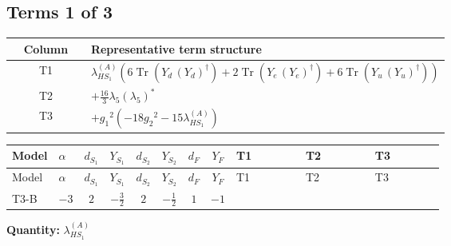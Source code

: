 \documentclass[8pt]{article}
\begin{document}
\begin{landscape}
\subsection*{Terms 1 of 3}
\begin{center}
\begin{tabular}{@{}c >{\raggedright\arraybackslash}p{0.82\linewidth}@{}}
\toprule
Column & Representative term structure \\
\midrule
T1 & \(\displaystyle {\lambda_{HS_1}^{(A)}} (6 \operatorname{Tr}\!\left({Y_d}\,\left({Y_d}\right)^{\dagger}\right)+2 \operatorname{Tr}\!\left({Y_e}\,\left({Y_e}\right)^{\dagger}\right)+6 \operatorname{Tr}\!\left({Y_u}\,\left({Y_u}\right)^{\dagger}\right))\) \\
\midrule
T2 & \(\displaystyle +\frac{16}{3} {\lambda_5} \left({\lambda_5}\right)^{*}\) \\
\midrule
T3 & \(\displaystyle +{g_1}^2 \left(-18 {g_2}^2-15 {\lambda_{HS_1}^{(A)}}\right)\) \\
\midrule
\bottomrule
\end{tabular}
\end{center}
\smallskip
\tiny
\begin{longtable}{@{}llcccccc >{\raggedright\arraybackslash}p{0.21\linewidth} >{\raggedright\arraybackslash}p{0.21\linewidth} >{\raggedright\arraybackslash}p{0.21\linewidth}@{}}
\toprule
Model & $\alpha$ & $d_{S_1}$ & $Y_{S_1}$ & $d_{S_2}$ & $Y_{S_2}$ & $d_F$ & $Y_F$ & T1 & T2 & T3 \\
\midrule
\endfirsthead
\toprule
Model & $\alpha$ & $d_{S_1}$ & $Y_{S_1}$ & $d_{S_2}$ & $Y_{S_2}$ & $d_F$ & $Y_F$ & T1 & T2 & T3 \\
\midrule
\endhead
T3-B & $-3$ & $2$ & $-\frac{3}{2}$ & $2$ & $-\frac{1}{2}$ & $1$ & $-1$ & \scriptsize\adjustbox{max width=\linewidth}{$\begin{gathered} {\lambda_{HS_1}^{(A)}} (6 \operatorname{Tr}\!\left({Y_d}\,\left({Y_d}\right)^{\dagger}\right)+2 \operatorname{Tr}\!\left({Y_e}\,\left({Y_e}\right)^{\dagger}\right)+6 \operatorname{Tr}\!\left({Y_u}\,\left({Y_u}\right)^{\dagger}\right))\end{gathered}$} & \scriptsize\adjustbox{max width=\linewidth}{$\begin{gathered} +\frac{16}{3} {\lambda_5} \left({\lambda_5}\right)^{*}\end{gathered}$} & \scriptsize\adjustbox{max width=\linewidth}{$\begin{gathered} +{g_1}^2 \left(-18 {g_2}^2-15 {\lambda_{HS_1}^{(A)}}\right)\end{gathered}$} \\
\midrule
\bottomrule
\end{longtable}
\clearpage
\noindent\textbf{Quantity: }$\lambda_{HS_1}^{(A)}$\par\smallskip

\end{landscape}
\end{document}
